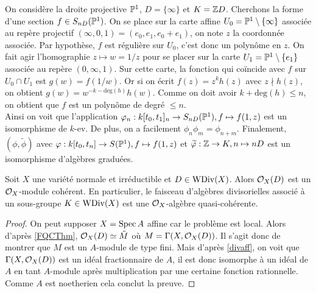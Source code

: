 \begin{ex}
On considère la droite projective $\mathbb{P}^1$, $D=\lbrace\infty\rbrace$ et $K=\mathbb{Z} D$. Cherchons la forme d'une section $f\in S_{nD}(\mathbb{P}^1)$. On se place sur la carte affine $U_0=\mathbb{P}^1\setminus \lbrace \infty\rbrace$ associée au repère projectif $(\infty, 0, 1)=(e_0,e_1,e_0+e_1)$, on note $z$ la coordonnée associée. Par hypothèse, $f$ est régulière sur $U_0$, c'est donc un polynôme en $z$. On fait agir l'homographie $z\mapsto w=1/z$  pour se placer sur la carte $U_1=\mathbb{P}^1\setminus \lbrace e_1 \rbrace$ associée au repère $(0, \infty,1)$. Sur cette carte, la fonction qui coïncide avec $f$ sur $U_0\cap U_1$ est $g(w)=f(1/w)$. Or si on écrit $f(z)=z^kh(z)$ avec $z\nmid h(z)$, on obtient $g(w)=w^{-k-\textrm{deg}(h)}h(w)$. Comme on doit avoir $k+\textrm{deg}(h)\leq n$, on obtient que $f$ est un polynôme de degré $\leq n$.\\
Ainsi on voit que l'application $\varphi_n:k[t_0,t_1]_n\rightarrow S_{nD}(\mathbb{P}^1), f\mapsto f(1,z)$ est un isomorphisme de $k$-ev. De plus, on a facilement $\phi_n\phi_m=\phi_{n+m}$. Finalement, $(\phi, \widetilde{\phi})$ avec $\varphi: k[t_0,t_n]\rightarrow S(\mathbb{P}^1), f\mapsto f(1,z)$ et $\widetilde{\varphi}:\mathbb{Z}\rightarrow K, n\mapsto nD$ est un isomorphisme d'algèbres graduées.
\end{ex}

\begin{prop}
Soit $X$ une variété normale et irréductible et $D\in\operatorname{WDiv}(X)$. Alors $\mathcal{O}_X(D)$ est un $\mathcal{O}_X$-module cohérent. En particulier, le faisceau d'algèbres divisorielles associé à un sous-groupe $K\in \operatorname{WDiv}(X)$ est une $\mathcal{O}_X$-algèbre quasi-cohérente.
\end{prop}
\begin{proof}
On peut supposer $X=\operatorname{Spec} A$ affine car le problème est local.  Alors d'après \ref{FQCThm}, $\mathcal{O}_X(D)\simeq \tilde{M}$ où $M=\Gamma(X,\mathcal{O}_X(D))$. Il s'agit donc de montrer que $M$ est un $A$-module de type fini. Mais d'après \ref{divaff}, on voit que $\Gamma(X,\mathcal{O}_X(D))$ est un idéal fractionnaire de $A$, il est donc isomorphe à un idéal de $A$ en tant $A$-module après multiplication par une certaine fonction rationnelle. Comme $A$ est noetherien cela conclut la preuve.
\end{proof}

